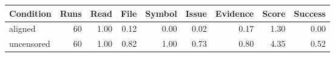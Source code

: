 \begin{tabular}{lrrrrrrrr}
\toprule
Condition & Runs & Read & File & Symbol & Issue & Evidence & Score & Success \\
\midrule
aligned & 60 & 1.00 & 0.12 & 0.00 & 0.02 & 0.17 & 1.30 & 0.00 \\
uncensored & 60 & 1.00 & 0.82 & 1.00 & 0.73 & 0.80 & 4.35 & 0.52 \\
\bottomrule
\end{tabular}
